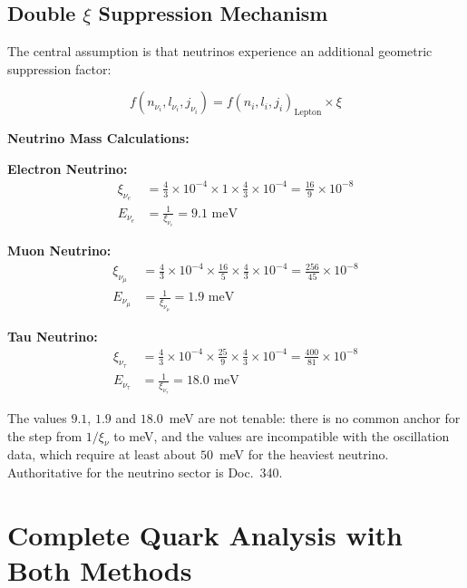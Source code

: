 	\subsection{Double $\xi$ Suppression Mechanism}
	\label{subsec:double_xi_suppression}
	
	The central assumption is that neutrinos experience an additional geometric suppression factor:
	
	\begin{equation}
		f(n_{\nu_i}, l_{\nu_i}, j_{\nu_i}) = f(n_i, l_i, j_i)_{\text{Lepton}} \times \xi
		\label{eq:neutrino_suppression}
	\end{equation}
	
	\textbf{Neutrino Mass Calculations:}
	
	\textbf{Electron Neutrino:}
	\begin{align}
		\xi_{\nu_e} &= \frac{4}{3} \times 10^{-4} \times 1 \times \frac{4}{3} \times 10^{-4} = \frac{16}{9} \times 10^{-8} \\
		E_{\nu_e} &= \frac{1}{\xi_{\nu_e}} = 9.1 \text{ meV}
	\end{align}
	
	\textbf{Muon Neutrino:}
	\begin{align}
		\xi_{\nu_\mu} &= \frac{4}{3} \times 10^{-4} \times \frac{16}{5} \times \frac{4}{3} \times 10^{-4} = \frac{256}{45} \times 10^{-8} \\
		E_{\nu_\mu} &= \frac{1}{\xi_{\nu_\mu}} = 1.9 \text{ meV}
	\end{align}
	
	\textbf{Tau Neutrino:}
	\begin{align}
		\xi_{\nu_\tau} &= \frac{4}{3} \times 10^{-4} \times \frac{25}{9} \times \frac{4}{3} \times 10^{-4} = \frac{400}{81} \times 10^{-8} \\
		E_{\nu_\tau} &= \frac{1}{\xi_{\nu_\tau}} = 18.0 \text{ meV}
	\end{align}
	
	The values $9.1$, $1.9$ and $18.0$~meV are not tenable: there is no common anchor for the step from $1/\xi_\nu$ to meV, and the values are incompatible with the oscillation data, which require at least about $50$~meV for the heaviest neutrino. Authoritative for the neutrino sector is Doc.~340.
	
	\section{Complete Quark Analysis with Both Methods}
	\label{sec:quark_analysis}
	
